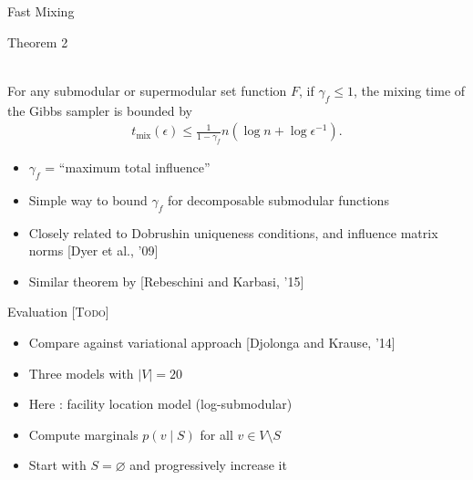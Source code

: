 \documentclass[mathserif]{beamer}
\newcommand{\todo}[1]{{\scriptsize\color{yellow}\textsc{[Todo]}}}
\newcommand{\qcite}[1]{{\scriptsize\color{col2}[#1]}}
\newcommand{\qtheorem}[2]{%
\begin{tcolorbox}[enhanced jigsaw,size=tight,boxsep=7pt,boxrule=0.7pt,coltext=textcolor,colframe=col2,colback=col1,opacityback=0,opacityframe=1]
\begin{minipage}{\textwidth}
{\color{col2}\strut Theorem #1}\\[0.7em]
#2
\end{minipage}
\end{tcolorbox}%
}
\begin{document}
\begin{frame}{Fast Mixing}
\vspace{0.5em}
\qtheorem{2}{
For any submodular or supermodular set function $F$, if $\gamma_f \leq 1$, the mixing time of the Gibbs sampler is bounded by
\vspace{-0.5em}
\begin{align*}
t_{\textrm{mix}}(\epsilon) \leq \frac{1}{1 - \gamma_f} n \left(\log n + \log\epsilon^{-1}\right).
\end{align*}
}

\vspace{0.5em}
\begin{itemize}
\item<1-> $\gamma_f$ = ``maximum total influence''
\vspace{0.5em}
\item<2-> Simple way to bound $\gamma_f$ for decomposable submodular functions
\vspace{0.5em}
\item<3-> Closely related to Dobrushin uniqueness conditions, and influence matrix norms \qcite{Dyer et al., '09}
\vspace{0.5em}
\item<4-> Similar theorem by \qcite{Rebeschini and Karbasi, '15}
\end{itemize}
\end{frame}

\begin{frame}{Evaluation \todo{}}
\vspace{0.5em}
\begin{itemize}
\item<1-> Compare against variational approach \qcite{Djolonga and Krause, '14}
\vspace{1.5em}
\item<2-> Three models with $|V| = 20$
\vspace{1.5em}
\item<3-> Here : facility location model (log-submodular)
\vspace{1.5em}
\item<4-> Compute marginals $p(v \mid S)$ for all $v \in V \setminus S$
\vspace{1.5em}
\item<5-> Start with $S = \varnothing$ and progressively increase it
\end{itemize}
\end{frame}
\end{document}
